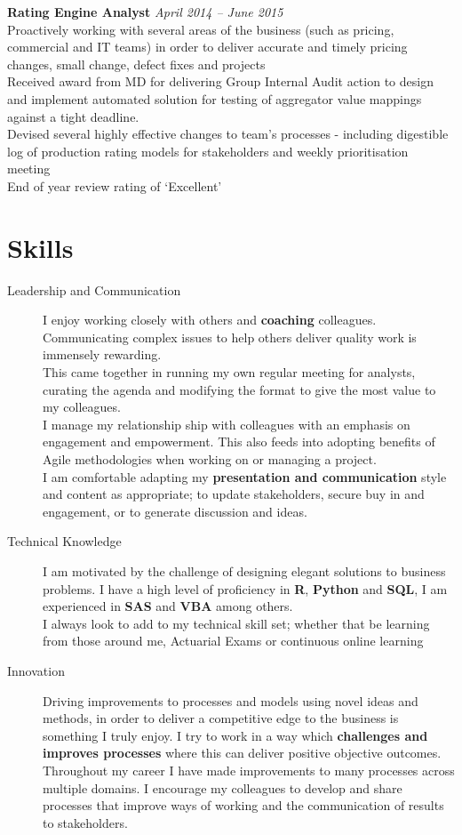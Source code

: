 \documentclass[11pt]{article}
\begin{document}
\begin{description}
\textbf{Rating Engine Analyst} \emph{April 2014 -- June 2015}\\
\textbullet \quad Proactively working with several areas of the business (such as pricing, commercial and IT teams) in order to deliver accurate and timely pricing changes, small change, defect fixes and projects\\
\textbullet \quad Received award from MD for delivering Group Internal Audit action to design and implement automated solution for testing of aggregator value mappings against a tight deadline.\\
\textbullet \quad Devised several highly effective changes to team's processes - including digestible log of production rating models for stakeholders and weekly prioritisation meeting \\
\textbullet \quad End of year review rating of `Excellent'
\end{description}

\section*{Skills}
\begin{description}
\item[Leadership and Communication] I enjoy working closely with others and \textbf{coaching} colleagues. Communicating complex issues to help others deliver quality work is immensely rewarding. \\
This came together in running my own regular meeting for analysts, curating the agenda and modifying the format to give the most value to my colleagues.\\ 
I manage my relationship ship with colleagues with an emphasis on engagement and empowerment. This also feeds into adopting benefits of Agile methodologies when working on or managing a project.\\
I am comfortable adapting my \textbf{presentation and communication} style and content as appropriate; to update stakeholders, secure buy in and engagement, or to generate discussion and ideas.
\item[Technical Knowledge] I am motivated by the challenge of designing elegant solutions to business problems.
I have a high level of proficiency in \textbf{R}, \textbf{Python} and \textbf{SQL}, I am experienced in \textbf{SAS} and \textbf{VBA} among others.\\
I always look to add to my technical skill set; whether that be learning from those around me, Actuarial Exams or continuous online learning
\item[Innovation] Driving improvements to processes and models using novel ideas and methods, in order to deliver a competitive edge to the business is something I truly enjoy. 
I try to work in a way which \textbf{challenges and improves processes} where this can deliver positive objective outcomes.\\
Throughout my career I have made improvements to many processes across multiple domains. I encourage my colleagues to develop and share processes that improve ways of working and the communication of results to stakeholders.
\end{description} 
\end{document}
